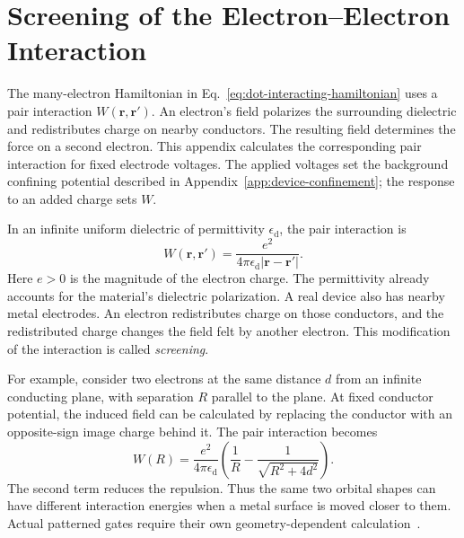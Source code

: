 \FloatBarrier
\section{Screening of the Electron--Electron Interaction}
\label{app:screened-interaction}

The many-electron Hamiltonian in Eq.~\eqref{eq:dot-interacting-hamiltonian}
uses a pair interaction $W(\mathbf r,\mathbf r')$. An electron's field
polarizes the surrounding dielectric and redistributes charge on
nearby conductors. The resulting field determines the force on a
second electron. This appendix calculates the corresponding pair
interaction for fixed electrode voltages. The applied voltages set
the background confining potential described in
Appendix~\ref{app:device-confinement}; the response to an added charge
sets $W$.

In an infinite uniform dielectric of permittivity $\epsilon_{\mathrm d}$,
the pair interaction is
\begin{equation}
 W(\mathbf r,\mathbf r')
   =\frac{e^2}{4\pi\epsilon_{\mathrm d}|\mathbf r-\mathbf r'|}.
 \label{eq:device-homogeneous-coulomb}
\end{equation}
Here $e>0$ is the magnitude of the electron charge. The permittivity
already accounts for the material's dielectric polarization. A real
device also has nearby metal electrodes.
An electron redistributes charge on those conductors, and the
redistributed charge changes the field felt by another electron.
This modification of the interaction is called \emph{screening}.

For example, consider two electrons at the same distance $d$
from an infinite conducting plane, with separation $R$ parallel
to the plane. At fixed conductor potential, the induced field
can be calculated by replacing the conductor with an opposite-sign
image charge behind it. The pair interaction becomes
\begin{equation}
 W(R)=\frac{e^2}{4\pi\epsilon_{\mathrm d}}
       \left(\frac1R-\frac1{\sqrt{R^2+4d^2}}\right).
 \label{eq:device-image-screening}
\end{equation}
The second term reduces the repulsion. Thus the same two orbital
shapes can have different interaction energies when a metal
surface is moved closer to them. Actual patterned gates require
their own geometry-dependent calculation~\cite{Knorzer2022}.

